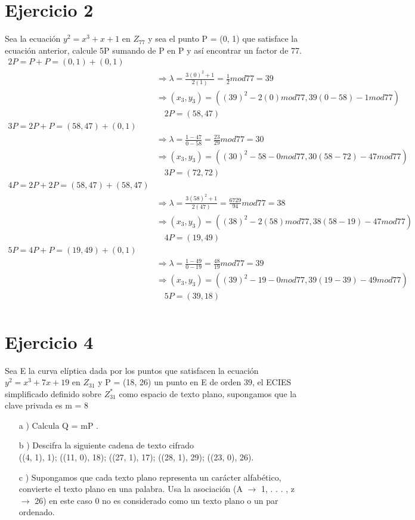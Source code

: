 \documentclass[12pt, letterpaper]{article}
\begin{document}
\section*{Ejercicio 2}
Sea la ecuación $y^2 = x^3 + x + 1$ en $Z_{77}$ y sea el punto P = (0, 1) que satisface la ecuación anterior, calcule 5P sumando de P en P y así encontrar un factor de 77.
\begin{equation*}
\begin{split}
2P = P + P = (0, 1) + (0, 1)\\
&\Rightarrow \lambda = \frac{3(0)^2 + 1}{2(1)} = \frac{1}{2} mod 77 = 39\\
&\Rightarrow (x_3, y_3) = ((39)^2-2(0) mod 77, 39(0-58)-1 mod 77)\\
&\quad 2P = (58, 47)\\
3P = 2P + P = (58, 47) + (0, 1)\\
&\Rightarrow \lambda = \frac{1-47}{0-58} = \frac{23}{29} mod 77 = 30\\
&\Rightarrow (x_3, y_3) = ((30)^2-58-0 mod 77, 30(58-72)-47 mod 77)\\
&\quad 3P = (72, 72)\\
4P = 2P + 2P = (58, 47) + (58, 47)\\
&\Rightarrow \lambda = \frac{3(58)^2 + 1}{2(47)} = \frac{6729}{94} mod 77 = 38\\
&\Rightarrow (x_3, y_3) = ((38)^2-2(58) mod 77, 38(58-19)-47 mod 77)\\
&\quad 4P = (19, 49)\\
5P = 4P + P = (19, 49) + (0, 1)\\
&\Rightarrow \lambda = \frac{1-49}{0-19} = \frac{48}{19} mod 77 = 39\\
&\Rightarrow (x_3, y_3) = ((39)^2-19-0 mod 77, 39(19-39)-49 mod 77)\\
&\quad 5P = (39, 18)\\
\end{split}
\end{equation*}

\section*{Ejercicio 4}
Sea E la curva elíptica dada por los puntos que satisfacen la ecuación $y^2 = x^3 + 7x + 19$ en $Z_{31}$ y P = (18, 26) un punto en E de orden 39, el ECIES simplificado definido sobre $Z^*_{31}$ como espacio de texto plano, supongamos que la clave privada es m = 8
\begin{itemize}
\item[a ) ] Calcula Q = mP .
\item[b ) ] Descifra la siguiente cadena de texto cifrado\\
((4, 1), 1); ((11, 0), 18); ((27, 1), 17); ((28, 1), 29); ((23, 0), 26).
\item[c ) ]  Supongamos que cada texto plano representa un carácter alfabético, convierte el texto plano en una palabra. Usa la asociación (A $\rightarrow$ 1, . . . , z $\rightarrow$ 26) en este caso 0 no es considerado como un texto plano o un par ordenado.

\end{itemize}
\end{document}
